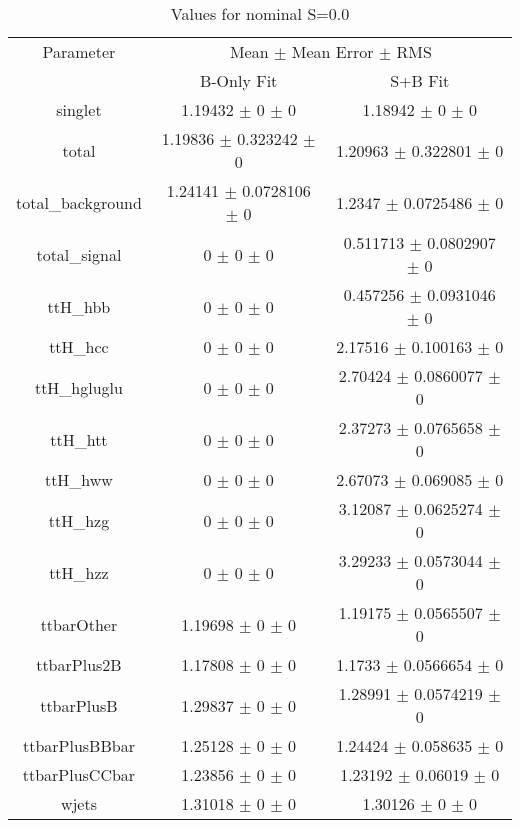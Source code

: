 \begin{table}
\centering
\caption{Values for nominal S=0.0}
\begin{tabular}{ccc}
\toprule
Parameter & \multicolumn{2}{c}{Mean $\pm$ Mean Error $\pm$ RMS}\\
 & B-Only Fit & S+B Fit\\
\midrule
singlet & \num{1.19432} $\pm$ \num{0} $\pm$ \num{0} & \num{1.18942} $\pm$ \num{0} $\pm$ \num{0}\\
total & \num{1.19836} $\pm$ \num{0.323242} $\pm$ \num{0} & \num{1.20963} $\pm$ \num{0.322801} $\pm$ \num{0}\\
total\_background & \num{1.24141} $\pm$ \num{0.0728106} $\pm$ \num{0} & \num{1.2347} $\pm$ \num{0.0725486} $\pm$ \num{0}\\
total\_signal & \num{0} $\pm$ \num{0} $\pm$ \num{0} & \num{0.511713} $\pm$ \num{0.0802907} $\pm$ \num{0}\\
ttH\_hbb & \num{0} $\pm$ \num{0} $\pm$ \num{0} & \num{0.457256} $\pm$ \num{0.0931046} $\pm$ \num{0}\\
ttH\_hcc & \num{0} $\pm$ \num{0} $\pm$ \num{0} & \num{2.17516} $\pm$ \num{0.100163} $\pm$ \num{0}\\
ttH\_hgluglu & \num{0} $\pm$ \num{0} $\pm$ \num{0} & \num{2.70424} $\pm$ \num{0.0860077} $\pm$ \num{0}\\
ttH\_htt & \num{0} $\pm$ \num{0} $\pm$ \num{0} & \num{2.37273} $\pm$ \num{0.0765658} $\pm$ \num{0}\\
ttH\_hww & \num{0} $\pm$ \num{0} $\pm$ \num{0} & \num{2.67073} $\pm$ \num{0.069085} $\pm$ \num{0}\\
ttH\_hzg & \num{0} $\pm$ \num{0} $\pm$ \num{0} & \num{3.12087} $\pm$ \num{0.0625274} $\pm$ \num{0}\\
ttH\_hzz & \num{0} $\pm$ \num{0} $\pm$ \num{0} & \num{3.29233} $\pm$ \num{0.0573044} $\pm$ \num{0}\\
ttbarOther & \num{1.19698} $\pm$ \num{0} $\pm$ \num{0} & \num{1.19175} $\pm$ \num{0.0565507} $\pm$ \num{0}\\
ttbarPlus2B & \num{1.17808} $\pm$ \num{0} $\pm$ \num{0} & \num{1.1733} $\pm$ \num{0.0566654} $\pm$ \num{0}\\
ttbarPlusB & \num{1.29837} $\pm$ \num{0} $\pm$ \num{0} & \num{1.28991} $\pm$ \num{0.0574219} $\pm$ \num{0}\\
ttbarPlusBBbar & \num{1.25128} $\pm$ \num{0} $\pm$ \num{0} & \num{1.24424} $\pm$ \num{0.058635} $\pm$ \num{0}\\
ttbarPlusCCbar & \num{1.23856} $\pm$ \num{0} $\pm$ \num{0} & \num{1.23192} $\pm$ \num{0.06019} $\pm$ \num{0}\\
wjets & \num{1.31018} $\pm$ \num{0} $\pm$ \num{0} & \num{1.30126} $\pm$ \num{0} $\pm$ \num{0}\\
\bottomrule
\end{tabular}
\end{table}